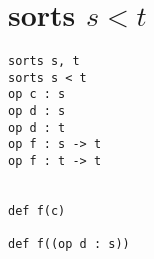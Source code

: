 \documentclass[11pt,a4paper]{article}
\begin{document}
\section*{sorts $s < t$}
\begin{verbatim}
sorts s, t
sorts s < t
op c : s
op d : s
op d : t
op f : s -> t
op f : t -> t


def f(c)

def f((op d : s))
\end{verbatim}
\end{document}
